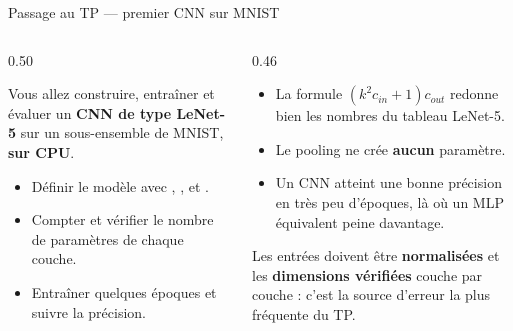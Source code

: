 \begin{frame}{Passage au TP --- premier CNN sur MNIST}
\begin{columns}[t]
\begin{column}{0.50\textwidth}
\begin{abox}
Vous allez construire, entraîner et évaluer un \textbf{CNN de type
LeNet-5} sur un sous-ensemble de MNIST, \textbf{sur CPU}.
\end{abox}
\begin{itemize}
  \item Définir le modèle avec , ,
   et .
  \item Compter et vérifier le nombre de paramètres de chaque couche.
  \item Entraîner quelques époques et suivre la précision.
\end{itemize}
\end{column}
\begin{column}{0.46\textwidth}
\begin{kbox}
\begin{itemize}
  \item La formule $(k^2 c_{in}+1)c_{out}$ redonne bien les nombres du
  tableau LeNet-5.
  \item Le pooling ne crée \textbf{aucun} paramètre.
  \item Un CNN atteint une bonne précision en très peu d'époques,
  là où un MLP équivalent peine davantage.
\end{itemize}
\end{kbox}
\begin{wbox}
Les entrées doivent être \textbf{normalisées} et les \textbf{dimensions
vérifiées} couche par couche : c'est la source d'erreur la plus fréquente
du TP.
\end{wbox}
\end{column}
\end{columns}
\end{frame}
